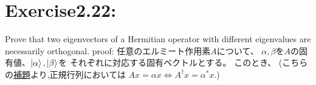\section{\Large Exercise2.22:}
Prove that two eigenvectors of a Hermitian operator 
with different eigenvalues are necessarily orthogonal.
\newline
{\large proof:}
任意のエルミート作用素$A$について、
$\alpha, \beta$を$A$の固有値、$\ket{\alpha}, \ket{\beta}$を
それぞれに対応する固有ベクトルとする。
このとき、
(こちらの\hyperlink{hodai.ex2.17}{補題}より,正規行列においては
$Ax = \alpha x \Leftrightarrow A^\dagger x = \alpha^* x.$)

